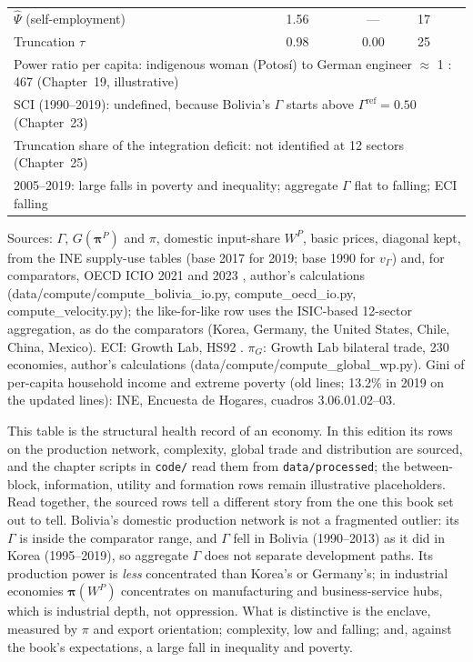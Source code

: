 \documentclass[../structural_economics_book.tex]{subfiles}
\begin{document}
\begin{example}
\begin{center}
\begin{tabular}{lccl}
$\hat{\Psi}$ (self-employment) & 1.56 & --- & 17 \\
Truncation $\tau$ & 0.98 & 0.00 & 25 \\
\midrule
\multicolumn{4}{p{0.8\textwidth}}{Power ratio per capita: indigenous woman (Potos\'{i}) to German engineer $\approx$ 1 : 467 (Chapter~19, illustrative)} \\
\multicolumn{4}{p{0.8\textwidth}}{SCI (1990--2019): undefined, because Bolivia's $\Gamma$ starts above $\Gamma^{\text{ref}} = 0.50$ (Chapter~23)} \\
\multicolumn{4}{p{0.8\textwidth}}{Truncation share of the integration deficit: not identified at 12 sectors (Chapter~25)} \\
\multicolumn{4}{p{0.8\textwidth}}{2005--2019: large falls in poverty and inequality; aggregate $\Gamma$ flat to falling; ECI falling} \\
\bottomrule
\end{tabular}
\par\footnotesize Sources: $\Gamma$, $G(\boldsymbol{\pi}^P)$ and $\pi$, domestic input-share $W^P$, basic prices, diagonal kept, from the INE supply-use tables (base 2017 for 2019; base 1990 for $v_\Gamma$) \citep{ine2026sut} and, for comparators, OECD ICIO 2021 and 2023 \citep{oecd2021icio,oecd2023icio}, author's calculations (data/compute/compute\_bolivia\_io.py, compute\_oecd\_io.py, compute\_velocity.py); the like-for-like row uses the ISIC-based 12-sector aggregation, as do the comparators (Korea, Germany, the United States, Chile, China, Mexico). ECI: Growth Lab, HS92 \citep{growthlab2026atlas}. $\pi_G$: Growth Lab bilateral trade, 230 economies, author's calculations (data/compute/compute\_global\_wp.py). Gini of per-capita household income and extreme poverty (old lines; 13.2\% in 2019 on the updated lines): INE, Encuesta de Hogares, cuadros 3.06.01.02--03.
\end{center}

This table is the structural health record of an economy. In this edition its rows on the production network, complexity, global trade and distribution are sourced, and the chapter scripts in \texttt{code/} read them from \texttt{data/processed}; the between-block, information, utility and formation rows remain illustrative placeholders. Read together, the sourced rows tell a different story from the one this book set out to tell. Bolivia's domestic production network is not a fragmented outlier: its $\Gamma$ is inside the comparator range, and $\Gamma$ fell in Bolivia (1990--2013) as it did in Korea (1995--2019), so aggregate $\Gamma$ does not separate development paths. Its production power is \emph{less} concentrated than Korea's or Germany's; in industrial economies $\boldsymbol{\pi}(W^P)$ concentrates on manufacturing and business-service hubs, which is industrial depth, not oppression. What is distinctive is the enclave, measured by $\pi$ and export orientation; complexity, low and falling; and, against the book's expectations, a large fall in inequality and poverty.
\end{example}
\end{document}
